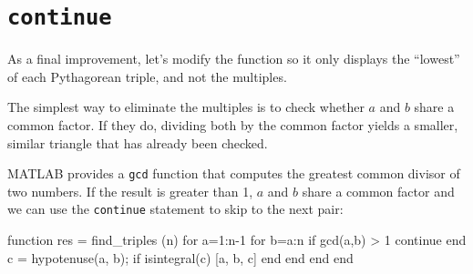 \documentclass[
]{book}
\numberwithin{Answer}{chapter}
\numberwithin{Exercise}{chapter}
\begin{document}
%
%
%
%
%
%
%
%
%


\section{{\tt continue}}

As a final improvement, let's modify the function so it only
displays the ``lowest'' of each Pythagorean triple, and not the
multiples.

The simplest way to eliminate the multiples is to check whether
$a$ and $b$ share a common factor.  If they do, dividing both
by the common factor yields a smaller, similar triangle that has
already been checked.

MATLAB provides a {\tt gcd} function that computes the greatest common
divisor of two numbers.  If the result is greater than 1,
$a$ and $b$ share a common factor and we can use the {\tt continue}
statement to skip to the next pair:

\begin{code}
function res = find_triples (n)
    for a=1:n-1
        for b=a:n
            if gcd(a,b) > 1
                continue
            end
            c = hypotenuse(a, b);
            if isintegral(c)
                [a, b, c]
            end
        end
    end
end
\end{code}
\end{document}
